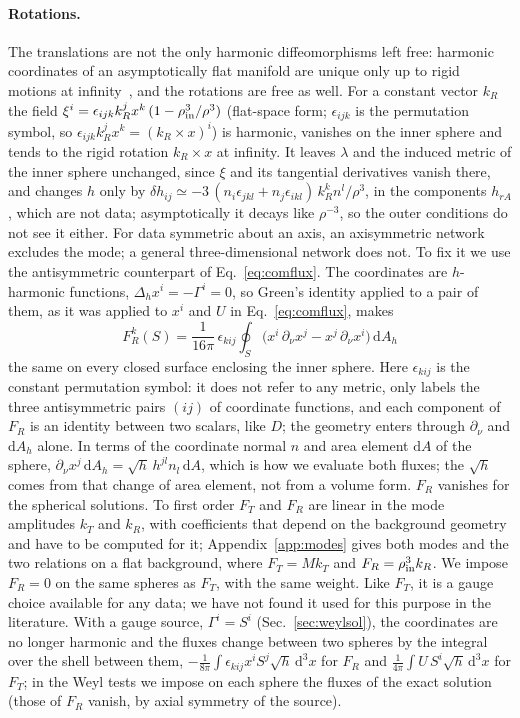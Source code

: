 \documentclass[aps,prd,twocolumn,superscriptaddress, nofootinbib,floatfix]{revtex4-2}
\newcommand{\dd}{\mathrm{d}}
\begin{document}
\paragraph{Rotations.} The translations are not the only harmonic diffeomorphisms left free: harmonic coordinates of an asymptotically flat manifold are unique only up to rigid motions at infinity~\cite{Bartnik1986}, and the rotations are free as well.
For a constant vector $k_R$ the field $\xi^i = \epsilon_{ijk}k_R^j x^k\,(1-\rho_{\rm in}^3/\rho^3)$ (flat-space form; $\epsilon_{ijk}$ is the permutation symbol, so $\epsilon_{ijk}k_R^jx^k = (k_R\times x)^i$) is harmonic, vanishes on the inner sphere and tends to the rigid rotation $k_R\times x$ at infinity.
It leaves $\lambda$ and the induced metric of the inner sphere unchanged, since $\xi$ and its tangential derivatives vanish there, and changes $h$ only by $\delta h_{ij}\simeq-3\,(n_i\epsilon_{jkl}+n_j\epsilon_{ikl})\,k_R^kn^l/\rho^3$, in the components $h_{rA}$, which are not data; asymptotically it decays like $\rho^{-3}$, so the outer conditions do not see it either.
For data symmetric about an axis, an axisymmetric network excludes the mode; a general three-dimensional network does not.
To fix it we use the antisymmetric counterpart of Eq.~\eqref{eq:comflux}.
The coordinates are $h$-harmonic functions, $\Delta_h x^i = -\Gamma^i = 0$, so Green's identity applied to a pair of them, as it was applied to $x^i$ and $U$ in Eq.~\eqref{eq:comflux}, makes
\begin{equation}
  F_R^k(S) = \frac1{16\pi}\,\epsilon_{kij}\oint_S\bigl(x^i\,\partial_\nu x^j - x^j\,\partial_\nu x^i\bigr)\,\dd A_h
  \label{eq:rotflux}
\end{equation}
the same on every closed surface enclosing the inner sphere.
Here $\epsilon_{kij}$ is the constant permutation symbol: it does not refer to any metric, only labels the three antisymmetric pairs $(ij)$ of coordinate functions, and each component of $F_R$ is an identity between two scalars, like $D$; the geometry enters through $\partial_\nu$ and $\dd A_h$ alone.
In terms of the coordinate normal $n$ and area element $\dd A$ of the sphere, $\partial_\nu x^j\,\dd A_h = \sqrt h\,h^{jl}n_l\,\dd A$, which is how we evaluate both fluxes; the $\sqrt h$ comes from that change of area element, not from a volume form.
$F_R$ vanishes for the spherical solutions.
To first order $F_T$ and $F_R$ are linear in the mode amplitudes $k_T$ and $k_R$, with coefficients that depend on the background geometry and have to be computed for it; Appendix~\ref{app:modes} gives both modes and the two relations on a flat background, where $F_T = M k_T$ and $F_R = \rho_{\rm in}^3 k_R$.
We impose $F_R=0$ on the same spheres as $F_T$, with the same weight.
Like $F_T$, it is a gauge choice available for any data; we have not found it used for this purpose in the literature.
With a gauge source, $\Gamma^i=S^i$ (Sec.~\ref{sec:weylsol}), the coordinates are no longer harmonic and the fluxes change between two spheres by the integral over the shell between them, $-\frac1{8\pi}\int\epsilon_{kij}x^iS^j\sqrt h\,\dd^3x$ for $F_R$ and $\frac1{4\pi}\int U\,S^i\sqrt h\,\dd^3x$ for $F_T$; in the Weyl tests we impose on each sphere the fluxes of the exact solution (those of $F_R$ vanish, by axial symmetry of the source).
\end{document}
